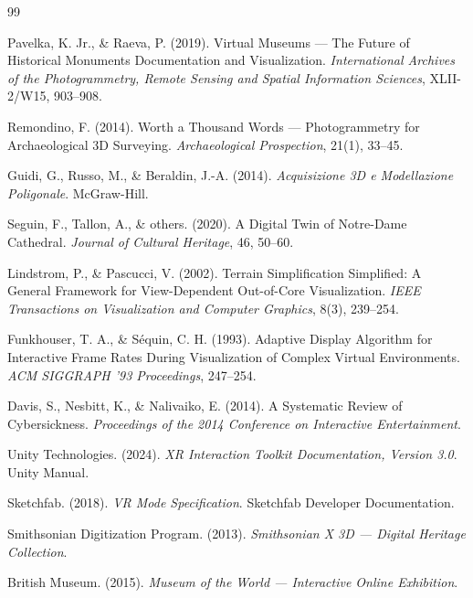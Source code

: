 \newpage
\renewcommand{\bibname}{References}

\begin{thebibliography}{99}

Pavelka, K. Jr., \& Raeva, P. (2019).
Virtual Museums --- The Future of Historical Monuments Documentation and Visualization.
\textit{International Archives of the Photogrammetry, Remote Sensing and Spatial Information Sciences}, XLII-2/W15, 903--908.

Remondino, F. (2014).
Worth a Thousand Words --- Photogrammetry for Archaeological 3D Surveying.
\textit{Archaeological Prospection}, 21(1), 33--45.

Guidi, G., Russo, M., \& Beraldin, J.-A. (2014).
\textit{Acquisizione 3D e Modellazione Poligonale}. McGraw-Hill.

Seguin, F., Tallon, A., \& others. (2020).
A Digital Twin of Notre-Dame Cathedral.
\textit{Journal of Cultural Heritage}, 46, 50--60.

Lindstrom, P., \& Pascucci, V. (2002).
Terrain Simplification Simplified: A General Framework for View-Dependent Out-of-Core Visualization.
\textit{IEEE Transactions on Visualization and Computer Graphics}, 8(3), 239--254.

Funkhouser, T. A., \& S\'equin, C. H. (1993).
Adaptive Display Algorithm for Interactive Frame Rates During Visualization of Complex Virtual Environments.
\textit{ACM SIGGRAPH '93 Proceedings}, 247--254.

Davis, S., Nesbitt, K., \& Nalivaiko, E. (2014).
A Systematic Review of Cybersickness.
\textit{Proceedings of the 2014 Conference on Interactive Entertainment}.

Unity Technologies. (2024).
\textit{XR Interaction Toolkit Documentation, Version 3.0}. Unity Manual.

Sketchfab. (2018).
\textit{VR Mode Specification}. Sketchfab Developer Documentation.

Smithsonian Digitization Program. (2013).
\textit{Smithsonian X 3D --- Digital Heritage Collection}.

British Museum. (2015).
\textit{Museum of the World --- Interactive Online Exhibition}.


\end{thebibliography}
